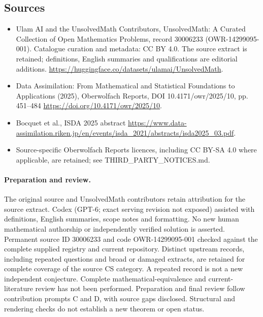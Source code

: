 \documentclass[11pt]{article}
\begin{document}
\subsection{Sources}
\begin{itemize}
\item[\hypertarget{source:30006233:1}{S1}] Ulam AI and the UnsolvedMath Contributors, UnsolvedMath: A Curated Collection of Open Mathematics Problems, record 30006233 (OWR-14299095-001). Catalogue curation and metadata: CC BY 4.0. The source extract is retained; definitions, English summaries and qualifications are editorial additions.
\url{https://huggingface.co/datasets/ulamai/UnsolvedMath}.
\item[\hypertarget{source:30006233:2}{S2}] Data Assimilation: From Mathematical and Statistical Foundations to Applications (2025), Oberwolfach Reports, DOI 10.4171/owr/2025/10, pp. 451--484
\url{https://doi.org/10.4171/owr/2025/10}.
\item[\hypertarget{source:30006233:3}{S3}] Bocquet et al., ISDA 2025 abstract
\url{https://www.data-assimilation.riken.jp/en/events/isda_2021/abstracts/isda2025_03.pdf}.
\item Source-specific Oberwolfach Reports licences, including CC BY-SA 4.0 where applicable, are retained; see THIRD\_PARTY\_NOTICES.md.
\end{itemize}
\paragraph{Preparation and review.}
The original source and UnsolvedMath contributors retain attribution for the source extract. Codex (GPT-6; exact serving revision not exposed) assisted with definitions, English summaries, scope notes and formatting. No new human mathematical authorship or independently verified solution is asserted. Permanent source ID 30006233 and code OWR-14299095-001 checked against the complete supplied registry and current repository. Distinct upstream records, including repeated questions and broad or damaged extracts, are retained for complete coverage of the source CS category. A repeated record is not a new independent conjecture. Complete mathematical-equivalence and current-literature review has not been performed. Preparation and final review follow contribution prompts C and D, with source gaps disclosed. Structural and rendering checks do not establish a new theorem or open status.
\label{end:30006233}
\end{document}
